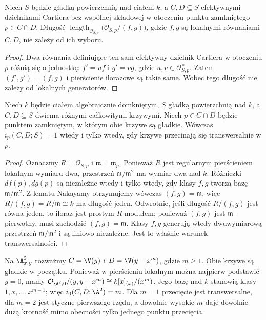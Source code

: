 \begin{stwierdzenie}
\label{st:ga6-independent-local}
Niech $S$ będzie gładką powierzchnią nad ciałem $k$,
a $C,D\subseteq S$ efektywnymi dzielnikami Cartiera
bez wspólnej składowej w otoczeniu punktu zamkniętego
$p\in C\cap D$. Długość
$\operatorname{length}_{\mathcal O_{S,p}}
\bigl(\mathcal O_{S,p}/(f,g)\bigr)$, gdzie $f,g$
są lokalnymi równaniami $C,D$, nie zależy od ich wyboru.
\end{stwierdzenie}
\begin{proof}
Dwa równania definiujące ten sam efektywny dzielnik
Cartiera w otoczeniu $p$ różnią się o jednostkę:
$f'=uf$ i $g'=vg$, gdzie $u,v\in\mathcal O_{S,p}^{\times}$.
Zatem $(f',g')=(f,g)$ i pierścienie ilorazowe są takie same.
Wobec tego długość nie zależy od lokalnych generatorów.
\end{proof}

\begin{stwierdzenie}
\label{st:ga6-transversal-one}
Niech $k$ będzie ciałem algebraicznie domkniętym,
$S$ gładką powierzchnią nad $k$, a $C,D\subseteq S$
dwiema różnymi całkowitymi krzywymi. Niech $p\in C\cap D$
będzie punktem zamkniętym, w którym obie krzywe są gładkie.
Wówczas $i_p(C,D;S)=1$ wtedy i tylko wtedy,
gdy krzywe przecinają się transwersalnie w $p$.
\end{stwierdzenie}
\begin{proof}
Oznaczmy $R=\mathcal O_{S,p}$ i $\mathfrak m=\mathfrak m_p$.
Ponieważ $R$ jest regularnym pierścieniem lokalnym wymiaru dwa,
przestrzeń $\mathfrak m/\mathfrak m^2$ ma wymiar dwa nad $k$.
Różniczki $df(p),dg(p)$ są niezależne wtedy i tylko wtedy,
gdy klasy $f,g$ tworzą bazę $\mathfrak m/\mathfrak m^2$.
Z lematu Nakayamy otrzymujemy wówczas $(f,g)=\mathfrak m$,
więc $R/(f,g)=R/\mathfrak m\cong k$ ma długość jeden.
Odwrotnie, jeśli długość $R/(f,g)$ jest równa jeden,
to iloraz jest prostym $R$-modułem; ponieważ $(f,g)$ jest
$\mathfrak m$-pierwotny, musi zachodzić $(f,g)=\mathfrak m$.
Klasy $f,g$ generują wtedy dwuwymiarową przestrzeń
$\mathfrak m/\mathfrak m^2$ i są liniowo niezależne.
Jest to właśnie warunek transwersalności.
\end{proof}

\begin{przyklad}
\label{prz:ga6-tangent}
Na $\A^2_{x,y}$ rozważmy $C=\V(y)$ i $D=\V(y-x^m)$,
gdzie $m\ge1$. Obie krzywe są gładkie w początku.
Ponieważ w pierścieniu lokalnym można najpierw podstawić
$y=0$, mamy
$\mathcal O_{\A^2,0}/(y,y-x^m)\cong k[x]_{(x)}/(x^m)$.
Jego bazę nad $k$ stanowią klasy $1,x,\ldots,x^{m-1}$;
więc $i_0(C,D;\A^2)=m$. Dla $m=1$ przecięcie jest
transwersalne, dla $m=2$ jest styczne pierwszego rzędu,
a dowolnie wysokie $m$ daje dowolnie dużą krotność mimo
obecności tylko jednego punktu przecięcia.
\end{przyklad}

